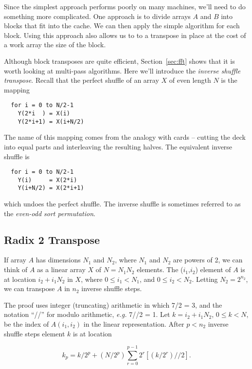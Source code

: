 \documentclass{article}
\begin{document}
Since the simplest approach performs poorly on many machines, we'll
need to do something more complicated.  One approach is to divide
arrays $A$ and $B$ into blocks that fit into the cache.  We can then
apply the simple algorithm for each block.  Using this approach also
allows us to to a transpose in place at the cost of a work array the
size of the block.

Although block transposes are quite efficient, Section~\ref{sec:fft}
shows that it is worth looking at multi-pass algorithms.  Here we'll
introduce the {\em inverse shuffle transpose}.  Recall that the
perfect shuffle of an array $X$ of even length $N$ is the mapping

\begin{verbatim}
  for i = 0 to N/2-1
    Y(2*i  ) = X(i)
    Y(2*i+1) = X(i+N/2)
\end{verbatim}
%
The name of this mapping comes from the analogy with cards -- cutting
the deck into equal parts and interleaving the resulting halves.  The
equivalent inverse shuffle is

\begin{verbatim}
  for i = 0 to N/2-1
    Y(i)     = X(2*i)
    Y(i+N/2) = X(2*i+1)
\end{verbatim}
%
which undoes the perfect shuffle.  The inverse shuffle is sometimes
referred to as the {\em even-odd sort permutation}.

\subsection{Radix 2 Transpose}
\label{sec:radix2}

If array $A$ has dimensions $N_1$ and $N_2$, where $N_1$ and $N_2$ are
powers of 2, we can think of $A$ as a linear array $X$ of $N = N_1
N_2$ elements.  The ($i_1$,$i_2$) element of $A$ is at location
$i_2+i_1N_2$ in $X$, where $0 \le i_1 < N_1$, and $0 \le i_2 < N_2$.
Letting $N_2 = 2^{n_2}$, we can transpose $A$ in $n_2$ inverse shuffle
steps.

The proof uses integer (truncating) arithmetic in which 7/2 = 3, and
the notation ``//'' for modulo arithmetic, {\em e.g.} 7//2 = 1.  Let
$k = i_2 + i_1N_2$, $0 \le k < N$, be the index of $A(i_1,i_2)$ in the
linear representation.  After $p<n_2$ inverse shuffle steps element
$k$ is at location

\begin{equation}\label{eqn:kp}
  k_p = k/2^p + (N/2^p) \sum_{r=0}^{p-1}2^r[(k/2^r)//2].
\end{equation}
\end{document}
